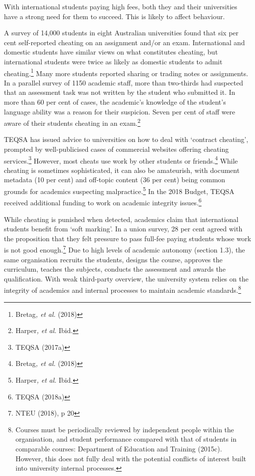 \documentclass[]{book}
\begin{document}
With international students paying high fees, both they and their universities have a strong need for them to succeed. This is likely to affect behaviour.

A survey of 14,000 students in eight Australian universities found that six per cent self-reported cheating on an assignment and/or an exam. International and domestic students have similar views on what constitutes cheating, but international students were twice as likely as domestic students to admit cheating.\footnote{Bretag\emph{, et al.} (2018)} Many more students reported sharing or trading notes or assignments. In a parallel survey of 1150 academic staff, more than two-thirds had suspected that an assessment task was not written by the student who submitted it. In more than 60 per cent of cases, the academic's knowledge of the student's language ability was a reason for their suspicion. Seven per cent of staff were aware of their students cheating in an exam.\footnote{Harper\emph{, et al.} Ibid.}

TEQSA has issued advice to universities on how to deal with `contract cheating', prompted by well-publicised cases of commercial websites offering cheating services.\footnote{TEQSA (2017a)} However, most cheats use work by other students or friends.\footnote{Bretag\emph{, et al.} (2018)} While cheating is sometimes sophisticated, it can also be amateurish, with document metadata (10 per cent) and off-topic content (36 per cent) being common grounds for academics suspecting malpractice.\footnote{Harper\emph{, et al.} Ibid.} In the 2018 Budget, TEQSA received additional funding to work on academic integrity issues.\footnote{TEQSA (2018a)}

While cheating is punished when detected, academics claim that international students benefit from `soft marking'. In a union survey, 28 per cent agreed with the proposition that they felt pressure to pass full-fee paying students whose work is not good enough.\footnote{NTEU (2018), p 20} Due to high levels of academic autonomy (section 1.3), the same organisation recruits the students, designs the course, approves the curriculum, teaches the subjects, conducts the assessment and awards the qualification. With weak third-party overview, the university system relies on the integrity of academics and internal processes to maintain academic standards.\footnote{Courses must be periodically reviewed by independent people within the organisation, and student performance compared with that of students in comparable courses: Department of Education and Training (2015c). However, this does not fully deal with the potential conflicts of interest built into university internal processes.}
\end{document}
